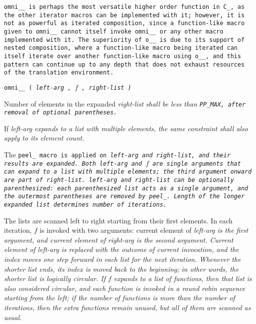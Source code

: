 \tt{omni__} is perhaps the most versatile higher order function in C\_, as the
other iterator macros can be implemented with it; however, it is not as powerful
as iterated composition, since a function-like macro given to \tt{omni__}
cannot itself invoke \tt{omni__} or any other macro implemented with it.
The superiority of \tt{o__} is due to its support of nested composition,
where a function-like macro being iterated can itself iterate over another
function-like macro using \tt{o__}, and this pattern can continue up to
any depth that does not exhaust resources of the translation environment.

\pagebreak


\tt{omni__ (} \it{left-arg} \tt{,} $f$ \tt{,} \it{right-list} \tt{)}


Number of elements in the expanded \it{right-list} shall be
less than \tt{PP_MAX}, after removal of optional parentheses.

If \it{left-arg} expands to a list with multiple elements,
the same constraint shall also apply to its element count.


The \tt{peel_} macro is applied on \it{left-arg}
and \it{right-list}, and their results are expanded.
Both \it{left-arg} and $f$ are single arguments that can expand to a list with
multiple elements; the third argument onward are part of \it{right-list}.
\it{left-arg} and \it{right-list} can be optionally parenthesized:
each parenthesized list acts as a single argument,
and the outermost parentheses are removed by \tt{peel_}.
Length of the longer expanded list determines number of iterations.

The lists are scanned left to right starting from their first elements.
In each iteration, $f$ is invoked with two arguments:
current element of \it{left-arg} is the first argument,
and current element of \it{right-arg} is the second argument.
Current element of \it{left-arg} is replaced with the
outcome of current invocation, and the index moves
one step forward in each list for the next iteration.
Whenever the shorter list ends, its index is moved back to the beginning;
in other words, the shorter list is logically circular.
If $f$ expands to a list of functions, then that list is also considered
circular, and each function is invoked in a round robin sequence starting from
the left; if the number of functions is more than the number of iterations,
then the extra functions remain unused, but all of them are scanned as usual.

